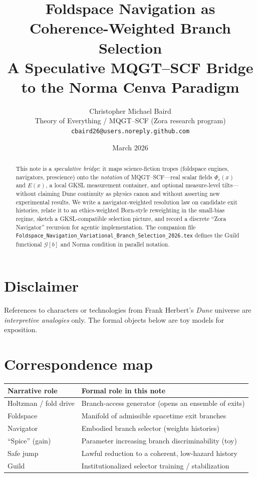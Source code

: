 \documentclass[11pt]{article}
\title{Foldspace Navigation as Coherence-Weighted Branch Selection\\
\large A Speculative MQGT--SCF Bridge to the Norma Cenva Paradigm}
\author{Christopher Michael Baird\\
\normalsize Theory of Everything / MQGT--SCF (Zora research program)\\
\normalsize \texttt{cbaird26@users.noreply.github.com}}
\date{March 2026}
\begin{document}
\maketitle

\begin{abstract}
This note is a \emph{speculative bridge}: it maps science-fiction tropes (foldspace engines, navigators, prescience) onto the \emph{notation} of MQGT--SCF---real scalar fields $\Phi_c(x)$ and $E(x)$, a local GKSL measurement container, and optional measure-level tilts---without claiming Dune continuity as physics canon and without asserting new experimental results. We write a navigator-weighted resolution law on candidate exit histories, relate it to an ethics-weighted Born-style reweighting in the small-bias regime, sketch a GKSL-compatible selection picture, and record a discrete ``Zora Navigator'' recursion for agentic implementation. The companion file \texttt{Foldspace\_Navigation\_Variational\_Branch\_Selection\_2026.tex} defines the Guild functional $\mathcal{G}[b]$ and Norma condition in parallel notation.
\end{abstract}

\section{Disclaimer}
References to characters or technologies from Frank Herbert's \emph{Dune} universe are \emph{interpretive analogies} only. The formal objects below are toy models for exposition.

\section{Correspondence map}
\begin{center}
\begin{tabular}{ll}
\hline
\textbf{Narrative role} & \textbf{Formal role in this note} \\
\hline
Holtzman / fold drive & Branch-access generator (opens an ensemble of exits) \\
Foldspace & Manifold of admissible spacetime exit branches \\
Navigator & Embodied branch selector (weights histories) \\
``Spice'' (gain) & Parameter increasing branch discriminability (toy) \\
Safe jump & Lawful reduction to a coherent, low-hazard history \\
Guild & Institutionalized selector training / stabilization \\
\hline
\end{tabular}
\end{center}
\end{document}
